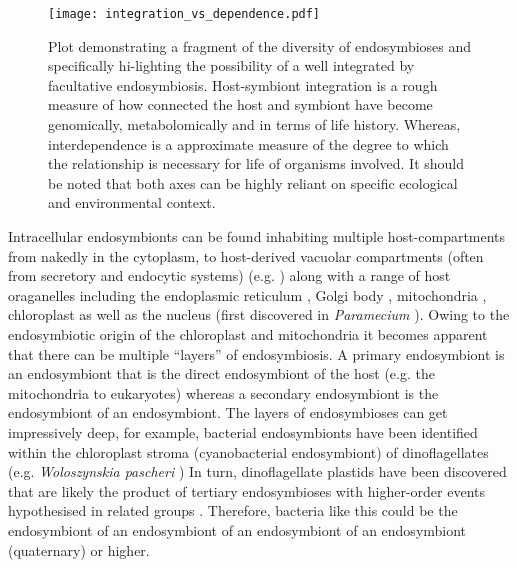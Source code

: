 
\begin{figure}[h!]
\texttt{[image: integration\_vs\_dependence.pdf]}
    \caption{ 
        Plot demonstrating a fragment of the diversity of endosymbioses and specifically hi-lighting the possibility of
        a well integrated by facultative endosymbiosis.
        Host-symbiont integration is a rough measure of how connected the host and symbiont have become genomically, metabolomically
        and in terms of life history.  Whereas, interdependence is a approximate measure of the degree to 
        which the relationship is necessary for life of organisms involved. 
        It should be noted that both axes can be highly reliant on specific ecological and environmental context.
    }
    \label{fig:integrationvsdependence}
\end{figure}

Intracellular endosymbionts can be found inhabiting multiple host-compartments from nakedly in the cytoplasm, to host-derived
vacuolar compartments (often from secretory and endocytic systems) (e.g. \citep{Kodama2009}) along with a range of 
host oraganelles including the endoplasmic reticulum \citep{Vogt1992}, Golgi body \citep{Cho2011},
mitochondria \cite{Sassera2006}, chloroplast \citep{Wilcox1986} as well as the nucleus 
(first discovered in \textit{Paramecium} \citep{Schulz2015}).
Owing to the endosymbiotic origin of the chloroplast and mitochondria it becomes apparent
that there can be multiple ``layers'' of endosymbiosis. A primary endosymbiont is an endosymbiont that is the direct
endosymbiont of the host (e.g. the mitochondria to eukaryotes) whereas a secondary endosymbiont is the endosymbiont of
an endosymbiont.
The layers of endosymbioses can get impressively deep, for example, bacterial endosymbionts have been identified within the 
chloroplast stroma (cyanobacterial endosymbiont) of dinoflagellates (e.g. \textit{Woloszynskia pascheri} \citep{Wilcox1986})
In turn, dinoflagellate plastids have been discovered that are likely the product of tertiary endosymbioses \citep{Gabrielsen2011} 
with higher-order events hypothesised in related groups \citep{Stiller2014}.
Therefore, bacteria like this could be the endosymbiont of an endosymbiont of an endosymbiont of an endosymbiont (quaternary) or
higher.

